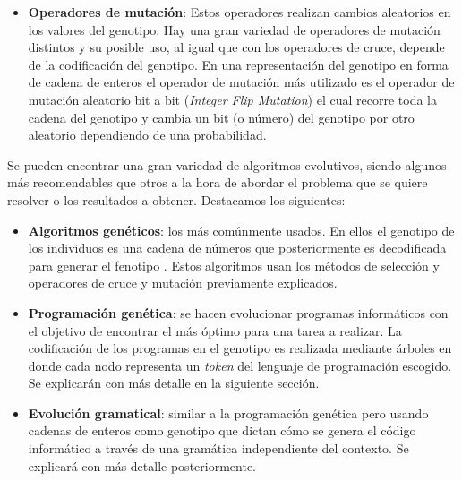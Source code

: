 \begin{itemize}
\item \textbf{Operadores de mutación}: Estos operadores realizan cambios aleatorios en los valores del genotipo. Hay una gran variedad de operadores de mutación distintos y su posible uso, al igual que con los operadores de cruce, depende de la codificación del genotipo. En una representación del genotipo en forma de cadena de enteros el operador de mutación más utilizado es el operador de mutación aleatorio bit a bit (\textit{Integer Flip Mutation}) el cual recorre toda la cadena del genotipo y cambia un bit (o número) del genotipo por otro aleatorio dependiendo de una probabilidad.
\end{itemize}

Se pueden encontrar una gran variedad de algoritmos evolutivos, siendo algunos más recomendables que otros a la hora de abordar el problema que se quiere resolver o los resultados a obtener. Destacamos los siguientes:
\begin{itemize}
\item \textbf{Algoritmos genéticos}: los más comúnmente usados. En ellos el genotipo de los individuos es una cadena de números que posteriormente es decodificada para generar el fenotipo \cite{cervigon09}. Estos algoritmos usan los métodos de selección y operadores de cruce y mutación previamente explicados. 

\item \textbf{Programación genética}: se hacen evolucionar programas informáticos con el objetivo de encontrar el más óptimo para una tarea a realizar. La codificación de los programas en el genotipo es realizada mediante árboles en donde cada nodo representa un \textit{token} del lenguaje de programación escogido. Se explicarán con más detalle en la siguiente sección.

\item \textbf{Evolución gramatical}: similar a la programación genética pero usando cadenas de enteros como genotipo que dictan cómo se genera el código informático a través de una gramática independiente del contexto. Se explicará con más detalle posteriormente.
\end{itemize}

